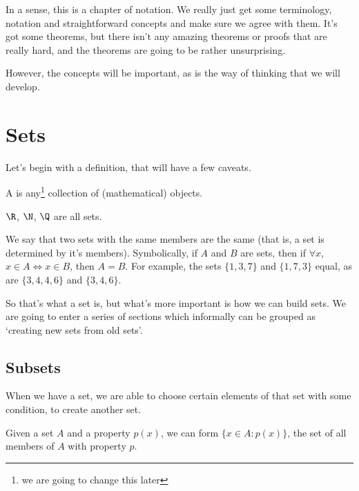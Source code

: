 \documentclass[a4paper]{scrreprt}
\begin{document}
In a sense, this is a chapter of notation. We really just get some terminology, notation and straightforward concepts and make sure we agree with them. It's got some theorems, but there isn't any amazing theorems or proofs that are really hard, and the theorems are going to be rather unsurprising.

However, the concepts will be important, as is the way of thinking that we will develop.

\section{Sets}

Let's begin with a definition, that will have a few caveats.

\begin{definition}[Set]
A  is any\footnote{we are going to change this later} collection of (mathematical) objects.
\end{definition}

\begin{example}
	$\R$, $\N$, $\Q$ are all sets.
\end{example}

We say that two sets with the same members are the same (that is, a set is determined by it's members).
Symbolically, if $A$ and $B$ are sets, then if $\forall x$, $x \in A \iff x \in B$, then $A = B$.
 For example, the sets $\{1, 3, 7 \}$ and $\{1, 7, 3\}$ equal, as are $\{3, 4, 4, 6\} $ and $\{3, 4, 6\}$.



So that's what a set is, but what's more important is how we can build sets. We are going to enter a series of sections which informally can be grouped as `creating new sets from old sets'.

\subsection{Subsets}

When we have a set, we are able to choose certain elements of that set with some condition, to create another set.


\begin{axiom}
	Given a set $A$ and a property $p(x)$, we can form $\{x \in A : p(x)\}$, the set of all members of $A$ with property $p$.
\end{axiom}
\end{document}
